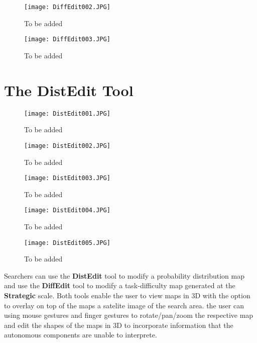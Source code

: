 \begin{figure}
\centering
\texttt{[image: DiffEdit002.JPG]}
\caption{To be added}
\label{DiffEdit002}
\end{figure}

\begin{figure}
\centering
\texttt{[image: DiffEdit003.JPG]}
\caption{To be added}
\label{DiffEdit003}
\end{figure}


\section{The DistEdit Tool}


\begin{figure}
\centering
\texttt{[image: DistEdit001.JPG]}
\caption{To be added}
\label{DistEdit001}
\end{figure}

\begin{figure}
\centering
\texttt{[image: DistEdit002.JPG]}
\caption{To be added}
\label{DistEdit002}
\end{figure}

\begin{figure}
\centering
\texttt{[image: DistEdit003.JPG]}
\caption{To be added}
\label{DistEdit003}
\end{figure}

\begin{figure}
\centering
\texttt{[image: DistEdit004.JPG]}
\caption{To be added}
\label{DistEdit004}
\end{figure}

\begin{figure}
\centering
\texttt{[image: DistEdit005.JPG]}
\caption{To be added}
\label{DistEdit005}
\end{figure}


Searchers can use the \textbf{DistEdit} tool to modify a probability distribution map and use the \textbf{DiffEdit} tool to modify a task-difficulty map generated at the \textbf{Strategic} scale. Both tools enable the user to view maps in 3D with the option to overlay on top of the maps a satelite image of the search area. the user can using mouse gestures and finger gestures to rotate/pan/zoom the respective map and edit the shapes of the maps in 3D to incorporate information that the autonomous components are unable to interprete. 

